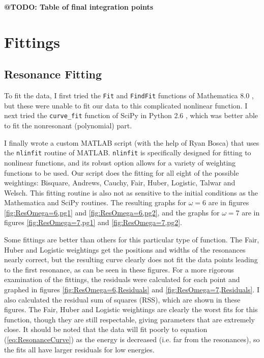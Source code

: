 \documentclass[Dissertation.tex]{subfiles}
\begin{document}
\textbf{@TODO: Table of final integration points}


\section{Fittings}
\label{sec:Fittings}

\subsection{Resonance Fitting}
\label{sec:ResonanceFit}
To fit the data, I first tried the \texttt{Fit} and \texttt{FindFit} functions of Mathematica\textsuperscript{\textregistered} 8.0 \cite{Mathematica}, but these were unable to fit our data to this complicated nonlinear function. I next tried the \texttt{curve\_fit} function of SciPy \cite{SciPy} in Python\textsuperscript{\textregistered} 2.6 \cite{Python}, which was better able to fit the nonresonant (polynomial) part.

I finally wrote a custom MATLAB\textsuperscript{\textregistered} \cite{matlab} script (with the help of Ryan Bosca) that uses the \texttt{nlinfit} routine of MATLAB. \texttt{nlinfit} is specifically designed for fitting to nonlinear functions, and its robust option allows for a variety of weighting functions to be used. Our script does the fitting for all eight of the possible weightings: Bisquare, Andrews, Cauchy, Fair, Huber, Logistic, Talwar and Welsch. This fitting routine is also not as sensitive to the initial conditions as the Mathematica and SciPy routines. The resulting graphs for $\omega = 6$ are in figures \ref{fig:ResOmega=6,pg1} and \ref{fig:ResOmega=6,pg2}, and the graphs for $\omega = 7$ are in figures \ref{fig:ResOmega=7,pg1} and \ref{fig:ResOmega=7,pg2}.

Some fittings are better than others for this particular type of function. The Fair, Huber and Logistic weightings get the positions and widths of the resonances nearly correct, but the resulting curve clearly does not fit the data points leading to the first resonance, as can be seen in these figures. For a more rigorous examination of the fittings, the residuals were calculated for each point and graphed in figures \ref{fig:ResOmega=6,Residuals} and \ref{fig:ResOmega=7,Residuals}. I also calculated the residual sum of squares (RSS), which are shown in these figures. The Fair, Huber and Logistic weightings are clearly the worst fits for this function, though they are still respectable, giving parameters that are extremely close. It should be noted that the data will fit poorly to equation (\ref{eq:ResonanceCurve}) as the energy is decreased (i.e. far from the resonances), so the fits all have larger residuals for low energies.


\cite{Tennyson1984} \cite{Stibbe1998} \cite{Sochi2013}
\end{document}
